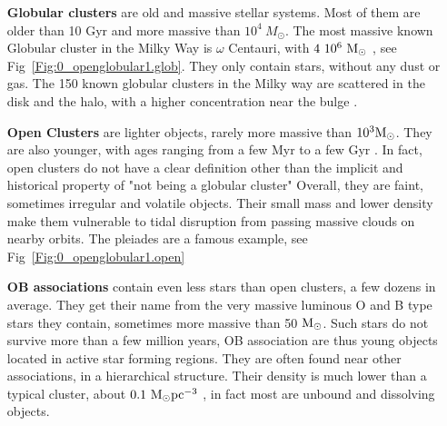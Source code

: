 \begin{itemize}


\item[\textbf{Globular clusters}] are old and massive stellar systems. Most of them are older than 10 Gyr and more massive than $10^4~M_\odot$. The most massive known Globular cluster in the Milky Way is $\omega$ Centauri, with $4~10^6~{\textrm{M}_\odot}$ \citep{Dsouza2013}, see Fig~\ref{Fig:0_openglobular1.glob}. They only contain stars, without any dust or gas. The 150 known globular clusters in the Milky way are scattered in the disk and the halo, with a higher concentration near the bulge \citep{Harris1996}. 

\item[\textbf{Open Clusters}] are lighter objects, rarely more massive than $10^3 {\textrm{M}_\odot}$. They are also younger, with ages ranging from a few Myr to a few Gyr \citep{Dias2002}. In fact, open clusters do not have a clear definition other than the implicit and historical property of "not being a globular cluster" Overall, they are faint, sometimes irregular and volatile objects. Their small mass and lower density make them vulnerable to tidal disruption from passing massive clouds on nearby orbits. The pleiades are a famous example, see Fig~\ref{Fig:0_openglobular1.open}

\item[\textbf{OB associations}] contain even less stars than open clusters, a few dozens in average. They get their name from the very massive luminous O and B type stars they contain, sometimes more massive than 50 ${\textrm{M}_\odot}$. Such stars do not survive more than a few million years, OB association are thus young objects located in active star forming regions. They are often found near other associations, in a hierarchical structure.  Their density is much lower than a typical cluster, about $0.1 ~{\textrm{M}_\odot} \textrm{pc}^{-3}$ \citep{Wright2014,Garcia2010},  in fact most are unbound and dissolving objects.


\end{itemize}
